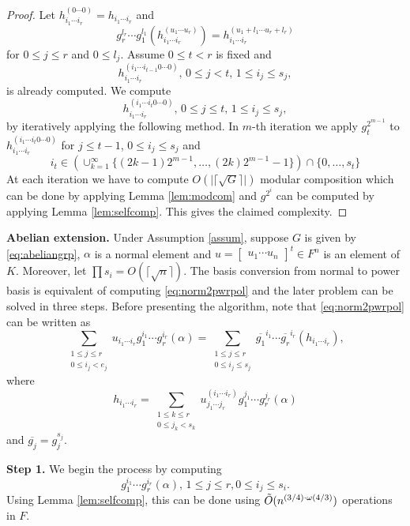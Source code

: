 \begin{proof}
Let $h_{i_1 \cdots i_r}^{(0 \cdots 0)} = h_{i_1 \cdots i_r}$ and $$g_r^{l_r} \cdots g_1^{l_1}(h_{i_1 \cdots i_r}^{(u_1 \cdots u_r)}) = h_{i_1 \cdots i_r}^{(u_1+l_1 \cdots u_r+l_r)}$$ for $0 \leq j \leq r$ and $0 \leq l_j$.
Assume $0 \leq t < r$ is fixed and $$h_{i_1 \cdots i_r}^{(i_1 \cdots i_{t-1}0 \cdots 0)}, \, 0 \leq j < t, \, 
1 \leq i_j \leq s_j,$$ is already computed. We compute 
$$h_{i_1 \cdots i_r}^{(i_1 \cdots i_{t}0 \cdots 0)}, \, 0 \leq j \leq t, \, 1 \leq i_j \leq s_j,$$
by iteratively applying the following method. In $m$-th iteration we apply $g_t^{2^{m-1}}$ to $h_{i_1 \cdots i_r}^{(i_1 \cdots i_{t}0 \cdots 0)}$ for $j \leq t-1$, $0 \leq i_j \leq s_j$ and 
$$i_t \in \left(\cup_{k = 1}^{\infty} \lbrace (2k-1)2^{m-1}, \ldots , (2k)2^{m-1}-1 \rbrace\right) \cap \lbrace 0 , \ldots , s_t \rbrace $$
At each iteration we have to compute $O(\vert \lceil \sqrt{G} \rceil \vert)$ modular composition which can be done by applying
Lemma \ref{lem:modcom} and $g^{2^i}$ can be computed by applying Lemma
\ref{lem:selfcomp}. This gives the claimed complexity.
\end{proof}

\textbf{Abelian extension.} Under Assumption \ref{assum}, suppose $G$ is given by \eqref{eq:abeliangrp}, $\alpha$ is a normal
element and $u = \begin{bmatrix} u_1 \cdots u_n \end{bmatrix}^t \in F^n$ is an element of $K$. Moreover, let 
$\prod s_i = O(\lceil \sqrt{n} \rceil)$. The basis conversion from normal to power basis is equivalent of computing \eqref{eq:norm2pwrpol} and
the later problem can be solved in three steps. Before presenting the algorithm, note that \eqref{eq:norm2pwrpol} can be written
as 
$$\sum_{\substack{1 \leq j \leq r\\ 0 \leq i_j < e_j}} u_{i_1 \cdots i_r} g_1^{i_1} \cdots g_r^{i_r}(\alpha) = \sum_{\substack{1 \leq j \leq r\\ 0 \leq i_j \leq s_j}} \overline{g_1}^{i_1} \cdots \overline{g_r}^{i_r} (h_{i_1 \cdots i_r}),$$ 
where $$h_{i_1 \cdots i_r} = \sum_{\substack{1 \leq k \leq r\\ 0 \leq j_k < s_k}} u^{(i_1 \cdots i_r)}_{j_1 \cdots j_r}
g_1^{j_1} \cdots g_r^{j_r}(\alpha)$$ and $\overline{g_j} = g_j^{s_j}$.

\textbf{Step 1.} We begin the process by computing $$g_1^{i_1} \cdots g_r^{i_r}(\alpha), \, 1 \leq j \leq r, 0 \leq i_j \leq s_i.$$
Using Lemma \ref{lem:selfcomp}, this can be done using $\tilde{O}(n^{(3/4)\cdot \omega(4/3)})$ operations in $F$.

